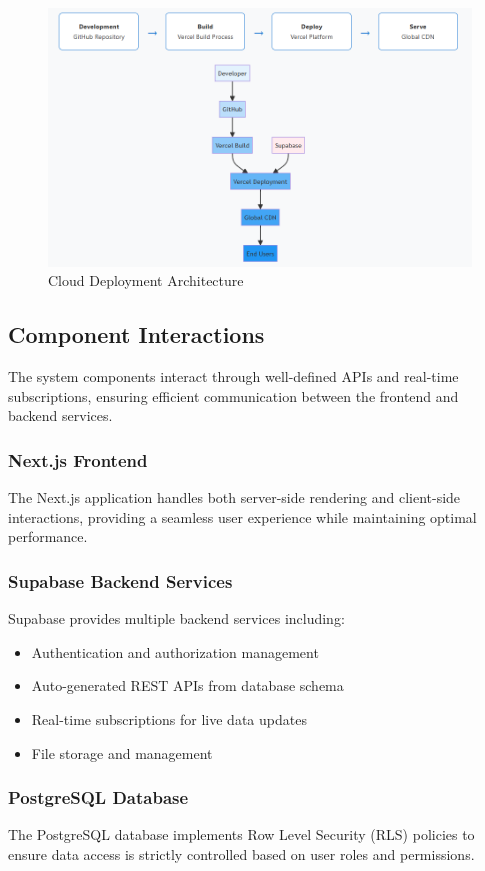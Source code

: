 \begin{figure}[hbt!]
    \centering
    \includegraphics[width=0.85\linewidth]{img/chap_02/deployment_architecture.png}
    \caption{Cloud Deployment Architecture}
    \label{fig:deployment_architecture}
\end{figure}

\subsection{Component Interactions}
The system components interact through well-defined APIs and real-time subscriptions, ensuring efficient communication between the frontend and backend services.

\subsubsection{Next.js Frontend}
The Next.js application handles both server-side rendering and client-side interactions, providing a seamless user experience while maintaining optimal performance.

\subsubsection{Supabase Backend Services}
Supabase provides multiple backend services including:
\begin{itemize}
\item Authentication and authorization management
\item Auto-generated REST APIs from database schema
\item Real-time subscriptions for live data updates
\item File storage and management
\end{itemize}

\subsubsection{PostgreSQL Database}
The PostgreSQL database implements Row Level Security (RLS) policies to ensure data access is strictly controlled based on user roles and permissions.

